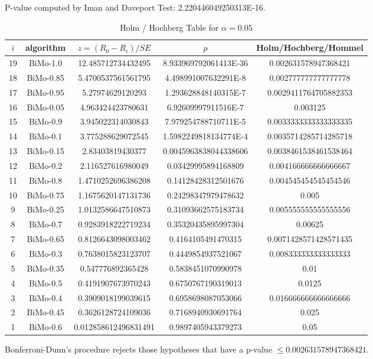 \documentclass[a4paper,10pt]{article}
\begin{document}
\begin{landscape}
P-value computed by Iman and Daveport Test: 2.220446049250313E-16.\newline

\begin{table}[!htp]
\centering\tiny
\caption{Holm / Hochberg Table for $\alpha=0.05$}
\begin{tabular}{ccccc}
$i$&algorithm&$z=(R_0 - R_i)/SE$&$p$&Holm/Hochberg/Hommel\\
\hline
19&BiMo-1.0&12.485712734432495&8.933969792061413E-36&0.002631578947368421\\
18&BiMo-0.85&5.4700537561561795&4.498991007632291E-8&0.002777777777777778\\
17&BiMo-0.95&5.27974629120293&1.293628848140315E-7&0.0029411764705882353\\
16&BiMo-0.05&4.963424423780631&6.92609997911516E-7&0.003125\\
15&BiMo-0.9&3.945022314030843&7.979254788710711E-5&0.0033333333333333335\\
14&BiMo-0.1&3.775288629072545&1.5982249818134774E-4&0.0035714285714285718\\
13&BiMo-0.15&2.83403819430377&0.0045963838044338606&0.0038461538461538464\\
12&BiMo-0.2&2.116527616980049&0.03429995894168809&0.004166666666666667\\
11&BiMo-0.8&1.4710252696386208&0.14128428312501676&0.004545454545454546\\
10&BiMo-0.75&1.1675620147131736&0.24298347979478632&0.005\\
9&BiMo-0.25&1.0132586647510873&0.31093662575183734&0.005555555555555556\\
8&BiMo-0.7&0.9283918222719234&0.35320435895997304&0.00625\\
7&BiMo-0.65&0.8126643098003462&0.4164105491470315&0.0071428571428571435\\
6&BiMo-0.3&0.7638015823123707&0.4449854937521067&0.008333333333333333\\
5&BiMo-0.35&0.547776892365428&0.5838451070990978&0.01\\
4&BiMo-0.5&0.4191907673970243&0.6750767190319013&0.0125\\
3&BiMo-0.4&0.3909018199039615&0.6958698087053066&0.016666666666666666\\
2&BiMo-0.45&0.3626128724109036&0.7168940930691764&0.025\\
1&BiMo-0.6&0.012858612496831491&0.9897405943379273&0.05\\
\hline
\end{tabular}
\end{table}
Bonferroni-Dunn's procedure rejects those hypotheses that have a p-value $\le0.002631578947368421$.



\end{landscape}
\end{document}
